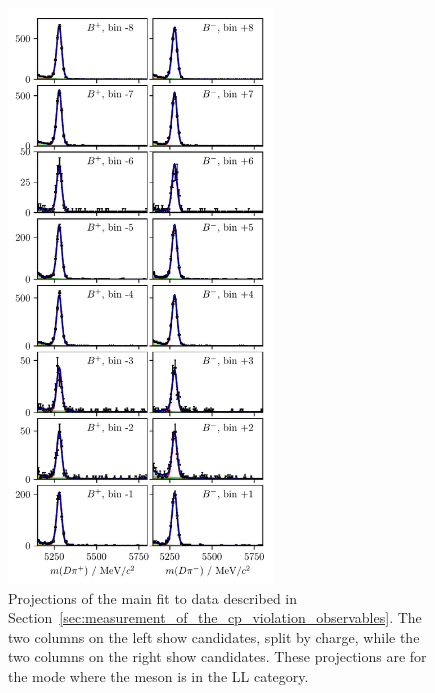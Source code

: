 \begin{figure}[tp]
    \includegraphics[height=6in]{figures/analysis/bin_by_bin/pretty_fit_bins_dpi_LL_1.pdf}
    \caption{Projections of the main fit to data described in Section~\ref{sec:measurement_of_the_cp_violation_observables}. The two columns on the left show \BtoDK candidates, split by charge, while the two columns on the right show \BtoDpi candidates. These projections are for the \DtoKspp mode where the \KS meson is in the LL category.}
    \label{fig:all_proj_LL_1}
\end{figure}

